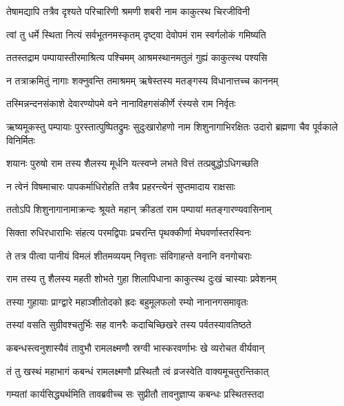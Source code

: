 \twolineshloka
{तेषामद्यापि तत्रैव दृश्यते परिचारिणी}
{श्रमणी शबरी नाम काकुत्स्थ चिरजीविनी} %

\twolineshloka
{त्वां तु धर्मे स्थिता नित्यं सर्वभूतनमस्कृतम्}
{दृष्ट्वा देवोपमं राम स्वर्गलोकं गमिष्यति} %

\twolineshloka
{ततस्तद्राम पम्पायास्तीरमाश्रित्य पश्चिमम्}
{आश्रमस्थानमतुलं गुह्यं काकुत्स्थ पश्यसि} %

\twolineshloka
{न तत्राक्रमितुं नागाः शक्नुवन्ति तमाश्रमम्}
{ऋषेस्तस्य मतङ्गस्य विधानात्तच्च काननम्} %

\twolineshloka
{तस्मिन्नन्दनसंकाशे देवारण्योपमे वने}
{नानाविहगसंकीर्णे रंस्यसे राम निर्वृतः} %

\threelineshloka
{ऋष्यमूकस्तु पम्पायाः पुरस्तात्पुष्पितद्रुमः}
{सुदुःखारोहणो नाम शिशुनागाभिरक्षितः}
{उदारो ब्रह्मणा चैव पूर्वकाले विनिर्मितः} %

\twolineshloka
{शयानः पुरुषो राम तस्य शैलस्य मूर्धनि}
{यत्स्वप्ने लभते वित्तं तत्प्रबुद्धोऽधिगच्छति} %

\twolineshloka
{न त्वेनं विषमाचारः पापकर्माधिरोहति}
{तत्रैव प्रहरन्त्येनं सुप्तमादाय राक्षसाः} %

\twolineshloka
{ततोऽपि शिशुनागानामाक्रन्दः श्रूयते महान्}
{क्रीडतां राम पम्पायां मतङ्गारण्यवासिनाम्} %

\twolineshloka
{सिक्ता रुधिरधाराभिः संहत्य परमद्विपाः}
{प्रचरन्ति पृथक्कीर्णा मेघवर्णास्तरस्विनः} %

\twolineshloka
{ते तत्र पीत्वा पानीयं विमलं शीतमव्ययम्}
{निवृत्ताः संविगाहन्ते वनानि वनगोचराः} %

\twolineshloka
{राम तस्य तु शैलस्य महती शोभते गुहा}
{शिलापिधाना काकुत्स्थ दुःखं चास्याः प्रवेशनम्} %

\twolineshloka
{तस्या गुहायाः प्राग्द्वारे महाञ्शीतोदको ह्रदः}
{बहुमूलफलो रम्यो नानानगसमावृतः} %

\twolineshloka
{तस्यां वसति सुग्रीवश्चतुर्भिः सह वानरैः}
{कदाचिच्छिखरे तस्य पर्वतस्यावतिष्ठते} %

\twolineshloka
{कबन्धस्त्वनुशास्यैवं तावुभौ रामलक्ष्मणौ}
{स्रग्वी भास्करवर्णाभः खे व्यरोचत वीर्यवान्} %

\twolineshloka
{तं तु खस्थं महाभागं कबन्धं रामलक्ष्मणौ}
{प्रस्थितौ त्वं व्रजस्वेति वाक्यमूचतुरन्तिकात्} %

\twolineshloka
{गम्यतां कार्यसिद्ध्यर्थमिति तावब्रवीच्च सः}
{सुप्रीतौ तावनुज्ञाप्य कबन्धः प्रस्थितस्तदा} %

